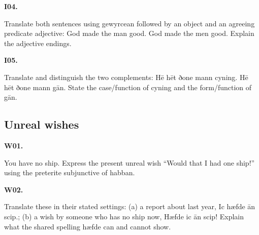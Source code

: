 \par\begin{minipage}{\linewidth}\raggedright
\textbf{I04.}

Translate both sentences using gewyrcean followed by an object and an agreeing predicate adjective: God made the man good. God made the men good. Explain the adjective endings.

\end{minipage}\par\addvspace{4pt}

\par\begin{minipage}{\linewidth}\raggedright
\textbf{I05.}

Translate and distinguish the two complements: Hē hēt ðone mann cyning. Hē hēt ðone mann gān. State the case/\allowbreak{}function of cyning and the form/\allowbreak{}function of gān.

\end{minipage}\par\addvspace{4pt}

\subsection*{Unreal wishes}

\par\begin{minipage}{\linewidth}\raggedright
\textbf{W01.}

You have no ship. Express the present unreal wish “Would that I had one ship!” using the preterite subjunctive of habban.

\end{minipage}\par\addvspace{4pt}

\par\begin{minipage}{\linewidth}\raggedright
\textbf{W02.}

Translate these in their stated settings: (a) a report about last year, Ic hæfde ān scip.; (b) a wish by someone who has no ship now, Hæfde ic ān scip! Explain what the shared spelling hæfde can and cannot show.

\end{minipage}\par\addvspace{4pt}

